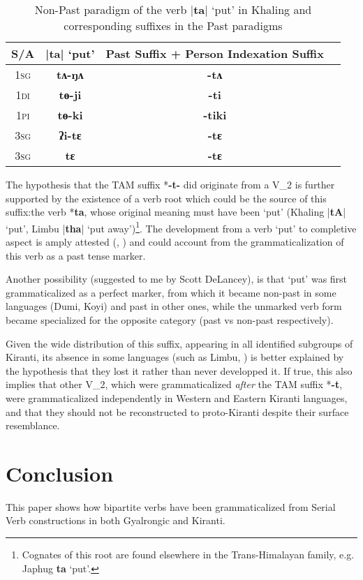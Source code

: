 \documentclass[oneside,a4paper,11pt]{article}
\newcommand{\ipa}[1]{{\phon\textbf{#1}}}
\newcommand{\dhatu}[2]{|\ipa{#1}| `#2'}
\begin{document}
\begin{table}[H]
\caption{Non-Past paradigm of the verb \dhatu{ta}{put} in Khaling and corresponding suffixes in the Past paradigms} \centering \label{tab:tANA}
\begin{tabular}{cccc}
\toprule
S/A & \dhatu{ta}{put} & Past Suffix + Person Indexation Suffix \\
\midrule
\textsc{1sg} & \ipa{tʌ-ŋʌ} &  \ipa{-tʌ}  \\
\textsc{1di} & \ipa{tɵ-ji} &  \ipa{-ti}  \\
\textsc{1pi} & \ipa{tɵ-ki} & \ipa{-tiki}  \\
\textsc{3sg} & \ipa{ʔi-tɛ} & \ipa{-tɛ}  \\
\textsc{3sg} & \ipa{tɛ} & \ipa{-tɛ}  \\
\bottomrule
\end{tabular}
\end{table}

The hypothesis that the TAM suffix *\ipa{-t-} did originate from a V_2 is further supported by the existence of a verb root which could be the source of this suffix:the verb *\ipa{ta}, whose original meaning must have been `put' (Khaling \dhatu{tA}{put}, Limbu \dhatu{tha}{put away})\footnote{Cognates of this root are found elsewhere in the Trans-Himalayan family, e.g. Japhug \ipa{ta} `put'.}. The development from a verb `put' to completive aspect is amply attested (\citealt[58]{bybee94TAM}, \citealt[248]{heine-kuteva02}) and could account from the grammaticalization of this verb as a past tense marker. 

Another possibility (suggested to me by Scott DeLancey), is that `put' was first grammaticalized as a perfect marker, from which it became non-past in some languages (Dumi, Koyi) and past in other ones, while the unmarked verb form became specialized for the opposite category (past vs non-past respectively).

Given the wide distribution of this suffix, appearing in all identified subgroups of Kiranti, its absence in some languages (such as Limbu, \citealt{driem87}) is better explained by the hypothesis that they lost it rather than never developped it. If true, this also implies that other V_2, which were grammaticalized \textit{after} the TAM suffix *\ipa{-t}, were grammaticalized independently in Western and Eastern Kiranti languages, and that they should not be reconstructed to proto-Kiranti despite their surface resemblance.

\section*{Conclusion}
This paper shows how bipartite verbs have been grammaticalized from Serial Verb constructions in both Gyalrongic and Kiranti. 
\end{document}
